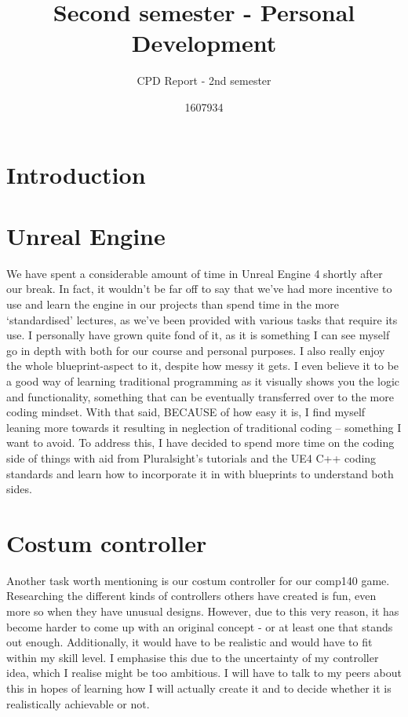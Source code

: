 \documentclass{scrartcl}
\title{Second semester -  Personal Development}
\subtitle{CPD Report - 2nd semester}
\author{1607934}
\begin{document}
\maketitle

\section{Introduction}


\section{Unreal Engine}
We have spent a considerable amount of time in Unreal Engine 4 shortly after our break. In fact, it wouldn't be far off to say that we've had more incentive to use and learn the engine in our projects than spend time in the more `standardised' lectures, as we've been provided with various tasks that require its use. I personally have grown quite fond of it, as it is something I can see myself go in depth with both for our course and personal purposes. I also really enjoy the whole blueprint-aspect to it, despite how messy it gets. I even believe it to be a good way of learning traditional programming as it visually shows you the logic and functionality, something that can be eventually transferred over to the more coding mindset. With that said, BECAUSE of how easy it is, I find myself leaning more towards it resulting in neglection of traditional coding -- something I want to avoid. To address this, I have decided to spend more time on the coding side of things with aid from Pluralsight's tutorials and the UE4 C++ coding standards and learn how to incorporate it in with blueprints to understand both sides. 

\section{Costum controller}
Another task worth mentioning is our costum controller for our comp140 game. Researching the different kinds of controllers others have created is fun, even more so when they have unusual designs. However, due to this very reason, it has become harder to come up with an original concept - or at least one that stands out enough. Additionally, it would have to be realistic and would have to fit within my skill level. I emphasise this due to the uncertainty of my controller idea, which I realise might be too ambitious. I will have to talk to my peers about this in hopes of learning how I will actually create it and to decide whether it is realistically achievable or not. 
\end{document}
